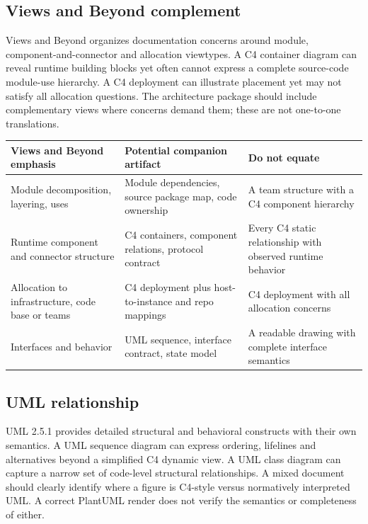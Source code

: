\documentclass[10pt,letterpaper]{article}
\begin{document}
\subsection{Views and Beyond complement}
Views and Beyond organizes documentation concerns around module, component-and-connector and allocation viewtypes. A C4 container diagram can reveal runtime building blocks yet often cannot express a complete source-code module-use hierarchy. A C4 deployment can illustrate placement yet may not satisfy all allocation questions. The architecture package should include complementary views where concerns demand them; these are not one-to-one translations.

\begin{tabularx}{\linewidth}{@{}YYY@{}}\toprule
\textbf{Views and Beyond emphasis} & \textbf{Potential companion artifact} & \textbf{Do not equate} \\ \midrule
Module decomposition, layering, uses & Module dependencies, source package map, code ownership & A team structure with a C4 component hierarchy \\
Runtime component and connector structure & C4 containers, component relations, protocol contract & Every C4 static relationship with observed runtime behavior \\
Allocation to infrastructure, code base or teams & C4 deployment plus host-to-instance and repo mappings & C4 deployment with all allocation concerns \\
Interfaces and behavior & UML sequence, interface contract, state model & A readable drawing with complete interface semantics \\
\bottomrule\end{tabularx}

\subsection{UML relationship}
UML 2.5.1 provides detailed structural and behavioral constructs with their own semantics. A UML sequence diagram can express ordering, lifelines and alternatives beyond a simplified C4 dynamic view. A UML class diagram can capture a narrow set of code-level structural relationships. A mixed document should clearly identify where a figure is C4-style versus normatively interpreted UML. A correct PlantUML render does not verify the semantics or completeness of either.
\end{document}
